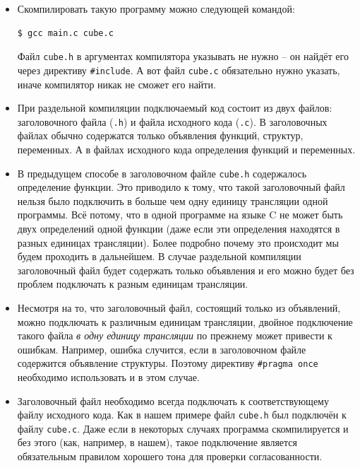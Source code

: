\documentclass[10pt]{article}
\begin{document}
\begin{itemize}

\item Скомпилировать такую программу можно следующей командой:
\begin{lstlisting}
$ gcc main.c cube.c
\end{lstlisting}
Файл \texttt{cube.h} в аргументах компилятора указывать не нужно -- он найдёт его через директиву \texttt{\#include}. А вот файл \texttt{cube.c} обязательно нужно указать, иначе компилятор никак не сможет его найти.

\item При раздельной компиляции подключаемый код состоит из двух файлов: заголовочного файла (\texttt{.h}) и файла исходного кода (\texttt{.c}). В заголовочных файлах обычно содержатся только объявления функций, структур, переменных. А в файлах исходного кода определения функций и переменных.

\item В предыдущем способе в заголовочном файле \texttt{cube.h} содержалось определение функции. Это приводило к тому, что такой заголовочный файл нельзя было подключить в больше чем одну единицу трансляции одной программы. Всё потому, что в одной программе на языке C не может быть двух определений одной функции (даже если эти определения находятся в разных единицах трансляции). Более подробно почему это происходит мы будем проходить в дальнейшем. В случае раздельной компиляции заголовочный файл будет содержать только объявления и его можно будет без проблем подключать к разным единицам трансляции.

\item Несмотря на то, что заголовочный файл, состоящий только из объявлений, можно подключать к различным единицам трансляции, двойное подключение такого файла \textit{в одну единицу трансляции} по прежнему может привести к ошибкам. Например, ошибка случится, если в заголовочном файле содержится объявление структуры. Поэтому директиву \texttt{\#pragma once} необходимо использовать и в этом случае.

\item Заголовочный файл необходимо всегда подключать к соответствующему файлу исходного кода. Как в нашем примере файл \texttt{cube.h} был подключён к файлу \texttt{cube.c}. Даже если в некоторых случаях программа скомпилируется и без этого (как, например, в нашем), такое подключение является обязательным правилом хорошего тона для проверки согласованности.
\end{itemize}
\end{document}
